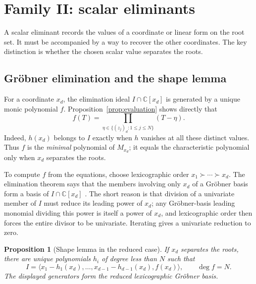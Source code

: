 \documentclass[12pt]{article}
\def\C{\mathbb{C}}
\newtheorem{proposition}[theorem]{Proposition}
\theoremstyle{definition}
\theoremstyle{remark}
\begin{document}
\section{Family II: scalar eliminants}\label{sec:familyII}

A scalar eliminant records the values of a coordinate or linear form on the root
set. It must be accompanied by a way to recover the other coordinates. The key
distinction is whether the chosen scalar value separates the roots.

\subsection{Gr\"obner elimination and the shape lemma}\label{sec:groebner}

For a coordinate $x_d$, the elimination ideal $I\cap\C[x_d]$ is generated by a
unique monic polynomial $f$. Proposition~\ref{prop:evaluation} shows directly that
\begin{equation}\label{eq:eliminant}
  f(T)=\prod_{\eta\in\{(z_j)_d:1\le j\le N\}}(T-\eta).
\end{equation}
Indeed, $h(x_d)$ belongs to $I$ exactly when $h$ vanishes at all these distinct values.
Thus $f$ is the \emph{minimal} polynomial of $M_{x_d}$; it equals the characteristic
polynomial only when $x_d$ separates the roots.

To compute $f$ from the equations, choose lexicographic order
$x_1\succ\cdots\succ x_d$. The elimination theorem says that the members involving
only $x_d$ of a Gr\"obner basis form a basis of $I\cap\C[x_d]$
\cite[Ch.~3]{cox2015ideals}. The short reason is that division of a univariate member
of $I$ must reduce its leading power of $x_d$; any Gr\"obner-basis leading monomial
dividing this power is itself a power of $x_d$, and lexicographic order then forces
the entire divisor to be univariate. Iterating gives a univariate reduction to zero.

\begin{proposition}[Shape lemma in the reduced case]\label{prop:shape}
If $x_d$ separates the roots, there are unique polynomials $h_i$ of degree less
than $N$ such that
\begin{equation}\label{eq:shape}
  I=\langle x_1-h_1(x_d),\ldots,x_{d-1}-h_{d-1}(x_d),f(x_d)\rangle,
  \qquad \deg f=N.
\end{equation}
The displayed generators form the reduced lexicographic Gr\"obner basis.
\end{proposition}
\end{document}
